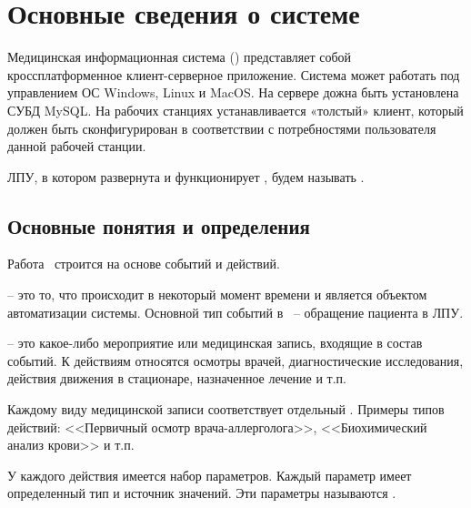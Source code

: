 \newpage
\section{Основные сведения о системе}

Медицинская информационная система (\tmis) представляет собой кроссплатформенное клиент-серверное приложение. Система может работать под управлением ОС Windows, Linux и MacOS. На сервере дожна быть установлена СУБД MySQL. На рабочих станциях устанавливается «толстый» клиент, который должен быть сконфигурирован в соответствии с потребностями пользователя данной рабочей станции.

ЛПУ, в котором развернута и функционирует \tmis, будем называть . 

\subsection{Основные понятия и определения}

Работа \tmis~строится на основе событий и действий.

 – это то, что происходит в некоторый момент времени и является объектом автоматизации системы. Основной тип событий в \tmis~-- обращение пациента в ЛПУ. 

 – это какое-либо мероприятие или медицинская запись, входящие в состав событий. К действиям относятся осмотры врачей, диагностические исследования, действия движения в стационаре, назначенное лечение и т.п. 

Каждому виду медицинской записи соответствует отдельный  . Примеры типов действий: <<Первичный осмотр врача-аллерголога>>, <<Биохимический анализ крови>> и т.п. 

У каждого действия имеется набор параметров. Каждый параметр имеет определенный тип и источник значений. Эти параметры называются .  
